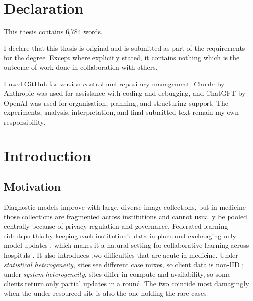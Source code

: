 \documentclass[11pt,a4paper]{report}
\begin{document}
\chapter*{Declaration}
This thesis contains 6,784 words.

I declare that this thesis is original and is submitted as part of the requirements
for the degree. Except where explicitly stated, it contains nothing which is the
outcome of work done in collaboration with others.

I used GitHub for version control and repository management. Claude by Anthropic
was used for assistance with coding and debugging, and ChatGPT by OpenAI was used
for organisation, planning, and structuring support. The experiments, analysis,
interpretation, and final submitted text remain my own responsibility.

\tableofcontents
\listoffigures
\listoftables


\pagestyle{fancy}
\chapter{Introduction}
\label{ch:intro}

\section{Motivation}
\label{sec:intro-motivation}

Diagnostic models improve with large, diverse image collections, but in medicine
those collections are fragmented across institutions and cannot usually be pooled
centrally because of privacy regulation and governance. Federated learning
sidesteps this by keeping each institution's data in place and exchanging only
model updates \citep{mcmahan2017fedavg, rieke2020future, sheller2020medicalfl},
which makes it a natural setting for collaborative learning across hospitals
\citep{kairouz2021advances, pati2022fets}. It also introduces two difficulties
that are acute in medicine. Under \emph{statistical heterogeneity}, sites see
different case mixes, so client data is non-IID \citep{zhao2018noniid}; under
\emph{system heterogeneity}, sites differ
in compute and availability, so some clients return only partial updates in a
round. The two coincide most damagingly when the under-resourced site is also the
one holding the rare cases.
\end{document}
